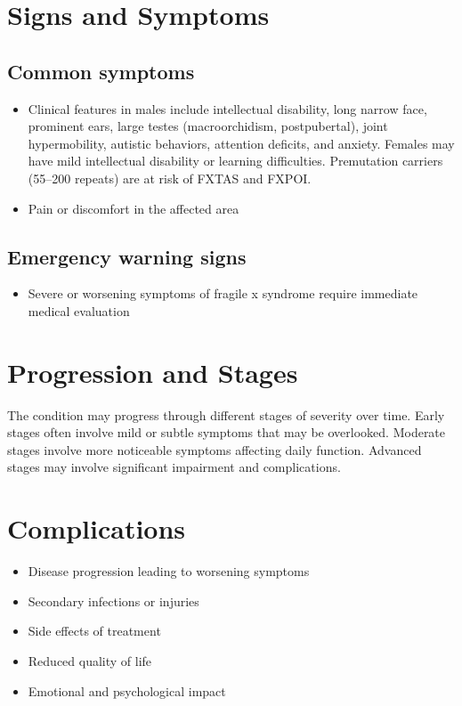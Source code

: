 \section{Signs and Symptoms}

\subsection{Common symptoms}
\begin{itemize}[noitemsep]
  \item Clinical features in males include intellectual disability, long narrow face, prominent ears, large testes (macroorchidism, postpubertal), joint hypermobility, autistic behaviors, attention deficits, and anxiety. Females may have mild intellectual disability or learning difficulties. Premutation carriers (55--200 repeats) are at risk of FXTAS and FXPOI.
  \item Pain or discomfort in the affected area
  \end{itemize}

\subsection{Emergency warning signs}
\begin{itemize}[noitemsep]
  \item Severe or worsening symptoms of fragile x syndrome require immediate medical evaluation
\end{itemize}
\section{Progression and Stages}
The condition may progress through different stages of severity over time. Early stages often involve mild or subtle symptoms that may be overlooked. Moderate stages involve more noticeable symptoms affecting daily function. Advanced stages may involve significant impairment and complications.
\section{Complications}
\begin{itemize}[noitemsep]
  \item Disease progression leading to worsening symptoms
  \item Secondary infections or injuries
  \item Side effects of treatment
  \item Reduced quality of life
  \item Emotional and psychological impact
\end{itemize}
